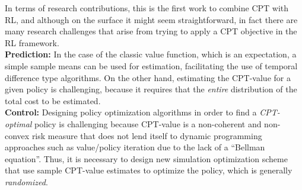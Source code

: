 \documentclass[11pt,letterpaper,english]{article}
\begin{document}
%
%

In terms of research contributions, this is the first work to combine CPT with RL, and although on the surface it might seem straightforward, in fact there are many research challenges that arise from trying to apply a CPT objective in the RL framework. \\
\textbf{Prediction:} In the case of the classic value function, which is an expectation, a simple sample means can be used for estimation, facilitating the use of temporal difference type algorithms. On the other hand, estimating the CPT-value for a given policy is challenging, because it requires that the \textit{entire} distribution of the total cost to be estimated.\\ 
\textbf{Control:} 
Designing policy optimization algorithms in order to find a \textit{CPT-optimal} policy is challenging because CPT-value is a non-coherent and non-convex risk measure that does not lend itself to dynamic programming approaches such as value/policy iteration due to the lack of a ``Bellman equation''. Thus, it is necessary to design new simulation optimization scheme that use sample CPT-value estimates to optimize the policy, which is generally \textit{randomized}. 
\end{document}
